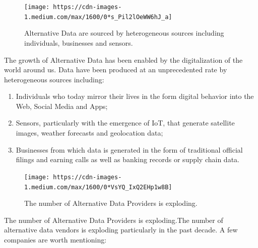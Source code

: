 \documentclass[]{book}
\providecommand{\tightlist}{%
  \setlength{\itemsep}{0pt}\setlength{\parskip}{0pt}}
\theoremstyle{definition}
\theoremstyle{definition}
\theoremstyle{definition}
\theoremstyle{remark}
\begin{document}
\begin{figure}[h]

{\centering \texttt{[image: https://cdn-images-1.medium.com/max/1600/0*s\_Pil2lOeWW6hJ\_a]} 

}

\caption{Alternative Data are sourced by heterogeneous sources including individuals, businesses and sensors.}\label{fig:unnamed-chunk-60}
\end{figure}

The growth of Alternative Data has been enabled by the digitalization of
the world around us. Data have been produced at an unprecedented rate by
heterogeneous sources including:

\begin{enumerate}
\def\labelenumi{\arabic{enumi}.}
\tightlist
\item
  Individuals who today mirror their lives in the form digital behavior
  into the Web, Social Media and Apps;
\item
  Sensors, particularly with the emergence of IoT, that generate
  satellite images, weather forecasts and geolocation data;
\item
  Businesses from which data is generated in the form of traditional
  official filings and earning calls as well as banking records or
  supply chain data.
\end{enumerate}

\begin{figure}[h]

{\centering \texttt{[image: https://cdn-images-1.medium.com/max/1600/0*VsYQ\_IxQ2EHp1w8B]} 

}

\caption{The number of Alternative Data Providers is exploding.}\label{fig:unnamed-chunk-61}
\end{figure}

The number of Alternative Data Providers is exploding.The number of
alternative data vendors is exploding particularly in the past decade. A
few companies are worth mentioning:
\end{document}
